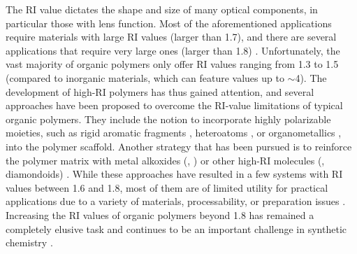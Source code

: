 The RI value dictates the shape and size of many optical components, in particular those with lens function. Most of the aforementioned applications require materials with large RI values (\ie  larger than 1.7), and there are several applications that require very large ones (\ie  larger than 1.8) \cite{Jintoku2014}. Unfortunately, the vast majority of organic polymers only offer RI values ranging from 1.3 to 1.5 \cite{Liu2009} (compared to inorganic materials, which can feature values up to $\sim$4). 
The development of high-RI polymers has thus gained attention, and several approaches have been proposed to overcome the RI-value limitations of typical organic polymers. They include the notion to incorporate highly polarizable moieties, such as rigid aromatic fragments \cite{Seto2010}, heteroatoms \cite{Griebel2014,Tojo2013}, or organometallics \cite{Ho2009}, into the polymer scaffold. Another strategy that has been pursued is to reinforce the polymer matrix with metal alkoxides (\eg  {}, ) \cite{Liu2013,Parke2013} or other high-RI molecules (\eg  {}, diamondoids) \cite{Zhang2014,Robello2013}. While these approaches have resulted in a few systems with RI values between 1.6 and 1.8, most of them are of limited utility for practical applications due to a variety of materials, processability, or preparation issues \cite{Liu2009}. Increasing the RI values of organic polymers beyond 1.8 has remained a completely elusive task and continues to be an important challenge in synthetic chemistry \cite{Griebel2014}. 

